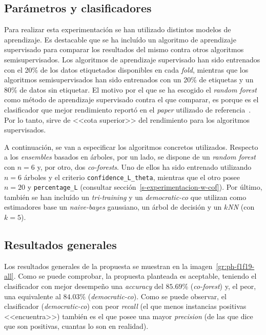 \subsection{Parámetros y clasificadores}

Para realizar esta experimentación se han utilizado distintos modelos de aprendizaje. Es destacable que se ha incluído un algoritmo de aprendizaje supervisado para comparar los resultados del mismo contra otros algoritmos semisupervisados. Los algoritmos de aprendizaje supervisado han sido entrenados con el 20\% de los datos etiquetados disponibles en cada \textit{fold}, mientras que los algoritmos semisupervisados han sido entrenados con un 20\% de etiquetas y un 80\% de datos sin etiquetar. El motivo por el que se ha escogido el \textit{random forest} como método de aprendizaje supervisado contra el que comparar, es porque es el clasificador que mejor rendimiento reportó en el \textit{paper} utilizado de referencia~\cite{featuresPhishing2018Gupta}. Por lo tanto, sirve de <<cota superior>> del rendimiento para los algoritmos supervisados.

A continuación, se van a especificar los algoritmos concretos utilizados. Respecto a los \textit{ensembles} basados en árboles, por un lado, se dispone de un \textit{random forest} con $n = 6$ y, por otro, dos \textit{co-forests}. Uno de ellos ha sido entrenado utilizando $n = 6$ árboles y el criterio \texttt{confidence\_L\_theta}, mientras que el otro posee $n = 20$ y \texttt{percentage\_L} (consultar sección~\ref{s-experimentacion-w-cof}). Por último, también se han incluído un \textit{tri-training} y un \textit{democratic-co} que utilizan como estimadores base un \textit{naive-bayes} gaussiano, un árbol de decisión y un \textit{$k$NN} (con $k = 5$).


\subsection{Resultados generales}

Los resultados generales de la propuesta se muestran en la imagen~\ref{gr:ph-f1f19-all}. Como se puede comprobar, la propuesta planteada es aceptable, teniendo el clasificador con mejor desempeño una \textit{accuracy} del $85$.$69\%$ (\textit{co-forest}) y, el peor, una equivalente al $84$.$03\%$ (\textit{democratic-co}). Como se puede observar, el clasificador (\textit{democratic-co}) con peor \textit{recall} (el que menos instancias positivas <<encuentra>>) también es el que posee una mayor \textit{precision} (de las que dice que son positivas, cuantas lo son en realidad).

